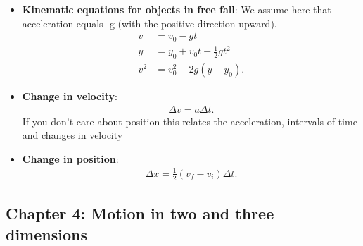 \documentclass{report}
\begin{document}
\begin{itemize}
        \item \textbf{Kinematic equations for objects in free fall}: We assume here that acceleration equals -g (with the positive direction upward).
            \begin{align*}
                v &= v_{0} - gt \\
                y &= y_{0} + v_{0}t-\frac{1}{2}gt^{2} \\
                v^{2} &= v_{0}^{2} -2g(y-y_{0})
            .\end{align*}
        \item \textbf{Change in velocity}:
            \begin{align*}
                \Delta v = a\Delta t
            .\end{align*}
            If you don't care about position this relates the acceleration,  intervals of time and changes in velocity
        \item \textbf{Change in position}:
            \begin{align*}
                \Delta x = \frac{1}{2}(v_{f} - v_{i})\Delta t
            .\end{align*}
    \end{itemize}

    \pagebreak 
    \subsection{Chapter 4: Motion in two and three dimensions}
    \smallbreak \noindent
\end{document}
